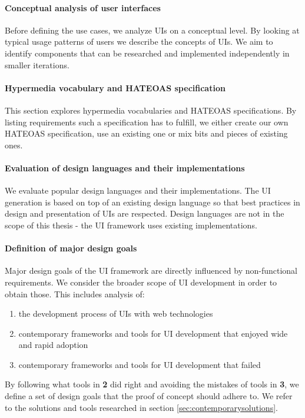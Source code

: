 \paragraph{Conceptual analysis of user interfaces}
Before defining the use cases, we analyze UIs on a conceptual level. By looking at typical usage patterns of users we describe the concepts of UIs. We aim to identify components that can be researched and implemented independently in smaller iterations.

\paragraph{Hypermedia vocabulary and HATEOAS specification}
This section explores hypermedia vocabularies and HATEOAS specifications. By listing requirements such a specification has to fulfill, we either create our own HATEOAS specification, use an existing one or mix bits and pieces of existing ones.

\paragraph{Evaluation of design languages and their implementations}
We evaluate popular design languages and their implementations. The UI generation is based on top of an existing design language so that best practices in design and presentation of UIs are respected. Design languages are not in the scope of this thesis - the UI framework uses existing implementations.

\paragraph{Definition of major design goals}
Major design goals of the UI framework are directly influenced by non-functional requirements. We consider the broader scope of UI development in order to obtain those. This includes analysis of:

\begin{enumerate}
  \item the development process of UIs with web technologies
  \item contemporary frameworks and tools for UI development that enjoyed wide and rapid adoption
  \item contemporary frameworks and tools for UI development that failed
\end{enumerate}

By following what tools in \textbf{2} did right and avoiding the mistakes of tools in \textbf{3}, we define a set of design goals that the proof of concept should adhere to. We refer to the solutions and tools researched in section \ref{sec:contemporarysolutions}.

